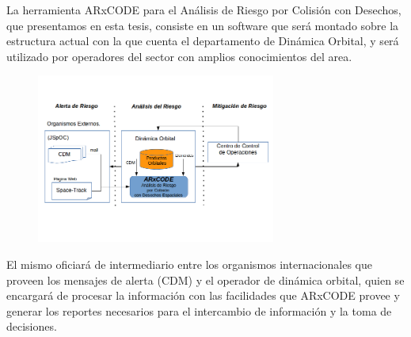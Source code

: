 La herramienta ARxCODE para el An\'alisis de Riesgo por Colisi\'on con Desechos, que presentamos en esta tesis, consiste en un software que ser\'a montado sobre la estructura actual con la que cuenta el departamento de Din\'amica Orbital, y ser\'a utilizado por operadores del sector con amplios conocimientos del area.\\
\begin{figure}[!h]
\centering
  \includegraphics[width=0.7\textwidth]{imagenes/interfasessistemas}
\end{figure}
El mismo oficiar\'a de intermediario entre los organismos internacionales que proveen los mensajes de alerta (CDM) y el operador de din\'amica orbital, quien se encargar\'a de procesar la informaci\'on con las facilidades que ARxCODE provee y generar los reportes necesarios para el intercambio de informaci\'on y la toma de decisiones.\\ 

